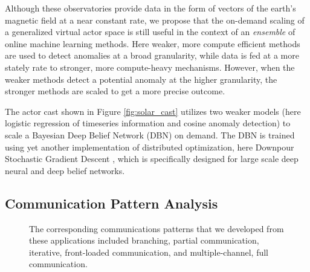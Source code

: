 \documentclass[conference,twocolumn,10pt]{IEEEtran}
\begin{document}
Although these observatories provide data in the form of vectors of the earth's magnetic field at a near constant rate, we propose that the on-demand scaling of a generalized virtual actor space is still useful in the context of an \textit{ensemble} of online machine learning methods. Here weaker, more compute efficient methods are used to detect anomalies at a broad granularity, while data is fed at a more stately rate to stronger, more compute-heavy mechanisms. However, when the weaker methods detect a potential anomaly at the higher granularity, the stronger methods are scaled to get a more precise outcome.

The actor cast shown in Figure \ref{fig:solar_cast} utilizes two weaker models (here logistic regression of timeseries information and cosine anomaly detection) to scale a Bayesian Deep Belief Network (DBN) on demand. The DBN is trained using yet another implementation of distributed optimization, here Downpour Stochastic Gradient Descent \cite{dean_large_2012}, which is specifically designed for large scale deep neural and deep belief networks.

\subsection{Communication Pattern Analysis}

\begin{figure}[!t]
    \centering
    \hfil
    \hfil
    \caption{The corresponding communications patterns that we developed from these applications included branching, partial communication, iterative, front-loaded communication, and multiple-channel, full communication.}
    \label{fig:communications_patterns}
\end{figure}
\end{document}
